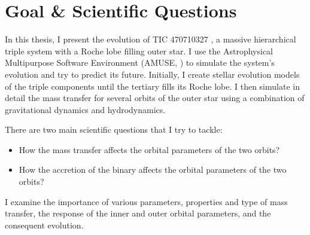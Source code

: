\section{Goal \& Scientific Questions}

In this thesis, I present the evolution of TIC 470710327 \citep{eisner2022planet}, a massive hierarchical triple system with a Roche lobe filling outer star. I use the Astrophysical Multipurpose Software Environment (AMUSE, \cite{pelupessy2013astrophysical,portegies2018astrophysical}) to simulate the system's evolution and try to predict its future. Initially, I create stellar evolution models of the triple components until the tertiary fills its Roche lobe. I then simulate in detail the mass transfer for several orbits of the outer star using a combination of gravitational dynamics and hydrodynamics. 

There are two main scientific questions that I try to tackle:

\begin{itemize}
    \item How the mass transfer affects the orbital parameters of the two orbits?
    \item How the accretion of the binary affects the orbital parameters of the two orbits?
\end{itemize}

I examine the importance of various parameters, properties and type of mass transfer, the response of the inner and outer orbital parameters, and the consequent evolution.



